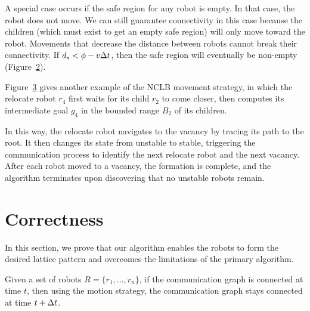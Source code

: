 A special case occurs if the safe region for any robot is empty.
%
In that case, the robot does not move.  
%
We can still guarantee connectivity in this case
because the children (which must exist to get an empty safe region) will only
move toward the robot.  
%
Movements that decrease the distance between robots
cannot break their connectivity.  
%
If \hbox{$d_s < \phi - v\Delta t$}, then the safe
region will eventually be non-empty (Figure~\ref{fig:safedist2}).

Figure~\ref{fig:safedist} gives another example of the NCLB movement strategy,
in which the relocate robot $r_4$ first waits for its child $r_2$ to come closer, then
computes its intermediate goal $g_4$ in the bounded range $B_2$ of its children.


In this way, the relocate robot navigates to the vacancy by tracing its path to the root.  
%
It then changes its
state from unstable to stable, triggering the communication process to identify
the next relocate robot and the next vacancy.  
%
After each robot moved to a vacancy, the formation is complete, and the algorithm terminates upon
discovering that no unstable robots remain.

\begin{figure}
\centering

\label{fig:nclb}
\end{figure}
\begin{figure}
\centering

\label{fig:safedist2}
\end{figure}
\begin{figure}
\centering

\label{fig:safedist}
\end{figure}


\section{Correctness}
\label{sec:proof}
In this section, we prove that our algorithm enables the robots to form the desired lattice pattern and overcomes the limitations of the primary algorithm.

\begin{lem}
    \label{lem:connected}
    Given a set of robots $R =\{r_1, \ldots, r_n\}$, if the
    communication graph is connected at time $t$, then using the motion
    strategy, the communication graph stays connected at time $t+\Delta t$.
\end{lem}


